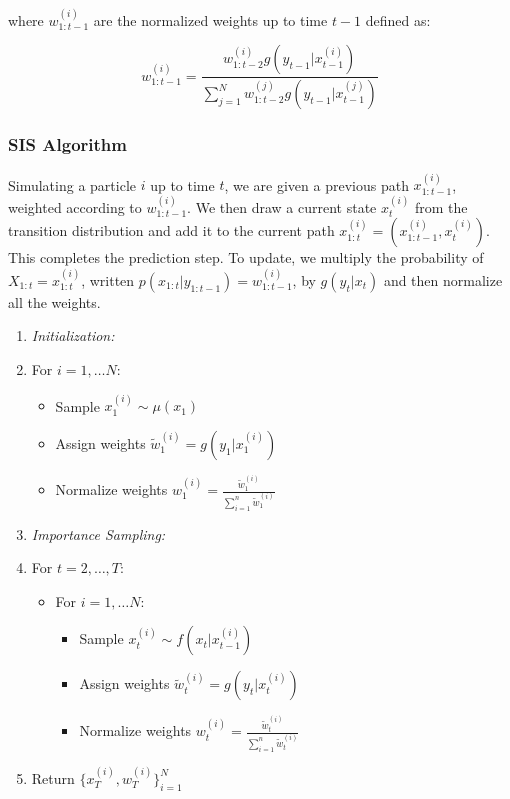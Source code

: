 \documentclass{article}
\begin{document}
\noindent
where $w_{1:t-1}^{(i)}$ are the normalized weights up to time $t-1$ defined as:

\begin{equation}
w_{1:t-1}^{(i)} = \frac{w_{1:t-2}^{(i)}g(y_{t-1}|x_{t-1}^{(i)})}{\sum_{j=1}^N w_{1:t-2}^{(j)}g(y_{t-1}|x_{t-1}^{(j)})}
\end{equation}


\subsubsection{SIS Algorithm}
Simulating a particle $i$ up to time $t$, we are given a previous path $x_{1:t-1}^{(i)}$, weighted according to $w_{1:t-1}^{(i)}$. We then draw a current state $x_{t}^{(i)}$ from the transition distribution and add it to the current path $x_{1:t}^{(i)} = (x_{1:t-1}^{(i)},x_t^{(i)})$. This completes the prediction step. To update, we multiply the probability of $X_{1:t} = x_{1:t}^{(i)}$, written $p(x_{1:t}|y_{1:t-1}) = w_{1:t-1}^{(i)}$, by $g(y_t|x_t)$ and then normalize all the weights.

\begin{enumerate}
\item \textit{Initialization:}
\item[] For $i=1,\dots N$:
\begin{itemize}
\item[] Sample $x_1^{(i)} \sim \mu(x_1)$
\item[] Assign weights $\widetilde{w}_1^{(i)} = g(y_1|x_1^{(i)})$
\item[] Normalize weights $w_1^{(i)} = \frac{\widetilde{w}_1^{(i)}}{\sum_{i=1}^{n} \widetilde{w}_1^{(i)}}$
\end{itemize}
\item \textit{Importance Sampling:}
\item[] For $t=2,\dots,T$:
\begin{itemize}
\item[] For $i=1,\dots N$:
\begin{itemize}
\item[] Sample $x_t^{(i)} \sim f(x_t|x_{t-1}^{(i)})$
\item[] Assign weights $\widetilde{w}_t^{(i)} = g(y_t|x_t^{(i)})$
\item[] Normalize weights $w_t^{(i)} = \frac{\widetilde{w}_t^{(i)}}{\sum_{i=1}^{n} \widetilde{w}_t^{(i)}}$
\end{itemize}
\end{itemize}
\item Return $\{x_T^{(i)},w_T^{(i)}\}_{i=1}^N$
\end{enumerate}
\end{document}
